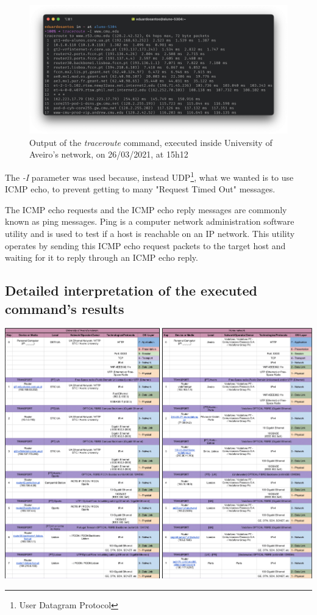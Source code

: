 \documentclass{article}
\begin{document}
\begin{figure}[H]
    \includegraphics[width=1 \textwidth]{images/tracerouteUA.png}
    \caption{Output of the \textit{traceroute} command, executed inside University of Aveiro's network, on 26/03/2021, at 15h12}
    \label{tracerouteUA}
\end{figure}


The \textit{-I} parameter was used because, instead UDP\footnote{User Datagram Protocol}, what we wanted is to use ICMP echo, to prevent getting to many "Request Timed Out" messages. 

The ICMP echo requests and the ICMP echo reply messages are commonly known as ping messages. Ping is a computer network administration software utility and is used to test if a host is reachable on an IP network. This utility operates by sending this ICMP echo request packets to the target host and waiting for it to reply through an ICMP echo reply.

\subsection{Detailed interpretation of the executed command's results}

\vspace*{\fill}
    \begin{center}
        \includegraphics[width=1 \textwidth]{images/traceroute_part1.png}
    \end{center}
\vspace*{\fill}
\end{document}
